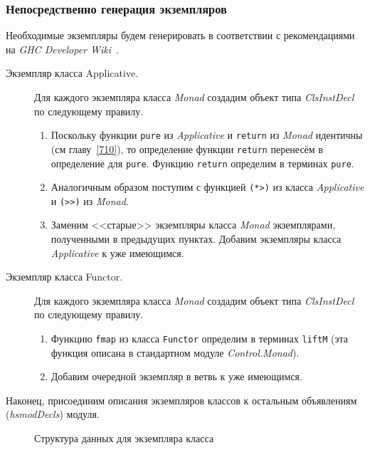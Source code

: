 \subsubsection{Непосредственно генерация экземпляров}\label{instgen}
Необходимые экземпляры будем генерировать в соответствии с рекомендациями на \textit{GHC Developer Wiki}~\autocite{migrat}.
\begin{description}
\item[Экземпляр класса Applicative.] Для каждого экземпляра класса \textit{Monad} создадим объект типа \textit{ClsInstDecl} по следующему правилу.
    \begin{enumerate}
        \item Поскольку функции \lstinline{pure} из \textit{Applicative} и \lstinline{return} из \textit{Monad} идентичны (см главу~\ref{710}), то определение функции \lstinline{return} перенесём в определение для \lstinline{pure}. Функцию \lstinline{return} определим в терминах \lstinline{pure}.
        \item Аналогичным образом поступим с функцией \lstinline{(*>)} из класса \textit{Applicative} и \lstinline{(>>)} из \textit{Monad}.
        \item Заменим <<старые>> экземпляры класса \textit{Monad} экземплярами, полученными в предыдущих пунктах. Добавим экземпляры класса \textit{Applicative} к уже имеющимся.
    \end{enumerate}
\item[Экземпляр класса Functor.] Для каждого экземпляра класса \textit{Monad} создадим объект типа \textit{ClsInstDecl} по следующему правилу.
    \begin{enumerate}
        \item Функцию \lstinline{fmap} из класса \lstinline{Functor} определим в терминах \lstinline{liftM} (эта функция описана в стандартном модуле \textit{Control.Monad}).
        \item Добавим очередной экземпляр в ветвь к уже имеющимся.
    \end{enumerate}
\end{description}

Наконец, присоединим описания экземпляров классов к остальным объявлениям (\textit{hsmodDecls}) модуля.

\begin{figure}[h]
\caption{Структура данных для экземпляра класса}\label{instance}
\end{figure}

